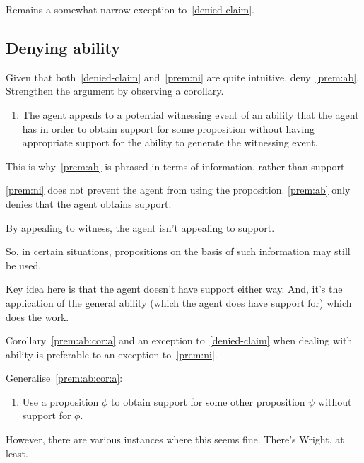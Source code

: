 \documentclass[10pt]{article}
\begin{document}
Remains a somewhat narrow exception to~\ref{denied-claim}.



\subsection{Denying ability}
\label{sec:denying-ability}

\begin{note}
Given that both~\ref{denied-claim} and~\ref{prem:ni} are quite intuitive, deny~\ref{prem:ab}.
Strengthen the argument by observing a corollary.

\begin{enumerate}
\item\label{prem:ab:cor:a} The agent appeals to a potential witnessing event of an ability that the agent has in order to obtain support for some proposition without having appropriate support for the ability to generate the witnessing event.
\end{enumerate}

This is why~\ref{prem:ab} is phrased in terms of information, rather than support.

\ref{prem:ni} does not prevent the agent from using the proposition.
\ref{prem:ab} only denies that the agent obtains support.

By appealing to witness, the agent isn't appealing to support.

So, in certain situations, propositions on the basis of such information may still be used.

Key idea here is that the agent doesn't have support either way.
And, it's the application of the general ability (which the agent does have support for) which does the work.

Corollary~\ref{prem:ab:cor:a} and an exception to~\ref{denied-claim} when dealing with ability is preferable to an exception to~\ref{prem:ni}.
\end{note}

\begin{note}
  Generalise~\ref{prem:ab:cor:a}:
  \begin{enumerate}
  \item\label{prem:ab:cor:b} Use a proposition \(\phi\) to obtain support for some other proposition \(\psi\) without support for \(\phi\).
  \end{enumerate}
  However, there are various instances where this seems fine.
  There's Wright, at least.
\end{note}
\end{document}
